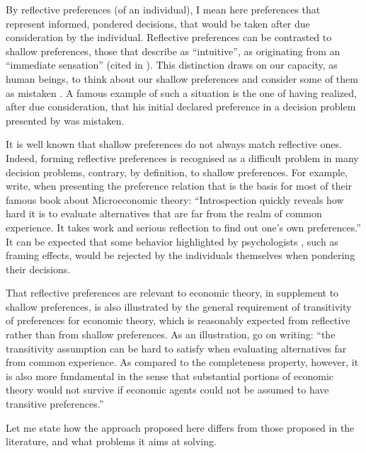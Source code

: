 \documentclass[version=last, pagesize, twoside=off, bibliography=totoc, DIV=calc, fontsize=12pt, a4paper, french, english]{scrartcl}
\begin{document}
By reflective preferences (of an individual), I mean here preferences that represent informed, pondered decisions, that would be taken after due consideration by the individual. Reflective preferences can be contrasted to shallow preferences, those that \citet[p.\ 16]{von_neumann_theory_2004} describe as “intuitive”, as originating from an “immediate sensation” (cited in \citet{fishburn_retrospective_1989}).
This distinction draws on our capacity, as human beings, to think about our shallow preferences and consider some of them as mistaken \citep{frankfurt_freedom_1971}. A famous example of such a situation is the one of \citet[pp.\ 101--103]{savage_foundations_1972} having realized, after due consideration, that his initial declared preference in a decision problem presented by \citet{allais_so-called_1979} was mistaken.

It is well known that shallow preferences do not always match reflective ones.
Indeed, forming reflective preferences is recognised as a difficult problem in many decision problems, contrary, by definition, to shallow preferences. For example, \citet[p.\ 6]{colell_microeconomic_1995} write, when presenting the preference relation that is the basis for most of their famous book about Microeconomic theory: “Introspection quickly reveals how hard it is to evaluate alternatives that are far from the realm of common experience. It takes work and serious reflection to find out one’s own preferences.” 
It can be expected that some behavior highlighted by psychologists \citet{lichtenstein_construction_2006}, such as framing effects, would be rejected by the individuals themselves when pondering their decisions. 

That reflective preferences are relevant to economic theory, in supplement to shallow preferences, is also illustrated by the general requirement of transitivity of preferences for economic theory, which is reasonably expected from reflective rather than from shallow preferences. As an illustration, \citet[p.\ 7]{colell_microeconomic_1995} go on writing: “the transitivity assumption can be hard to satisfy when evaluating alternatives far from common experience. As compared to the completeness property, however, it is also more fundamental in the sense that substantial portions of economic theory would not survive if economic agents could not be assumed to have transitive preferences.” 

Let me state how the approach proposed here differs from those proposed in the literature, and what problems it aims at solving.
\end{document}

